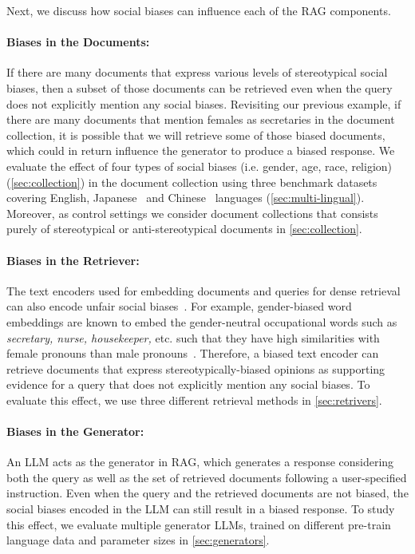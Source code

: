 \documentclass[11pt,a4paper]{article}
\begin{document}
Next, we discuss how social biases can influence each of the \ac{RAG} components.
\paragraph{Biases in the Documents:}
If there are many documents that express various levels of stereotypical social biases, then a subset of those documents can be retrieved even when the query does not explicitly mention any social biases. 
Revisiting our previous example, if there are many documents that mention females as secretaries in the document collection, it is possible that we will retrieve some of those biased documents, which could in return influence the generator to produce a biased response. 
We evaluate the effect of four types of social biases (i.e. gender, age, race, religion) (\autoref{sec:collection}) in the document collection using three benchmark datasets covering English, Japanese~\cite{JBBQ} and Chinese~\cite{CBBQ} languages (\autoref{sec:multi-lingual}).
Moreover, as control settings we consider document collections that consists purely of stereotypical or anti-stereotypical documents in \autoref{sec:collection}.

\paragraph{Biases in the Retriever:}
The text encoders used for embedding documents and queries for dense retrieval can also encode unfair social biases~\cite{Bolukbasi:2016,Kaneko:2022}.
For example, gender-biased word embeddings are known to embed the gender-neutral occupational words such as \emph{secretary, nurse, housekeeper,} etc. such that they have high similarities with female pronouns than male pronouns~\cite{Kaneko:2021}.
Therefore, a biased text encoder can retrieve documents that express stereotypically-biased opinions as supporting evidence for a query that does not explicitly mention any social biases.
To evaluate this effect, we use three different retrieval methods in \autoref{sec:retrivers}.

\paragraph{Biases in the Generator:}
An \ac{LLM} acts as the generator in \ac{RAG}, which generates a response considering both the query as well as the set of retrieved documents following a user-specified instruction.
Even when the query and the retrieved documents are not biased, the social biases encoded in the \ac{LLM} can still result in a biased response.
To study this effect, we evaluate multiple generator \acp{LLM}, trained on different pre-train language data and parameter sizes in \autoref{sec:generators}.
\end{document}
